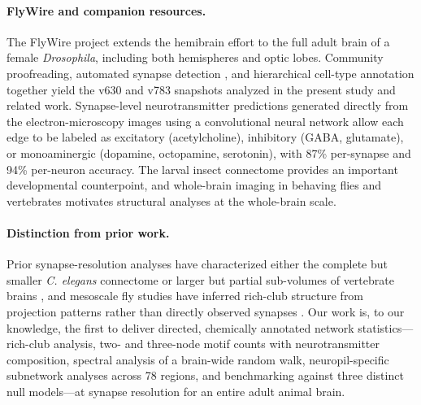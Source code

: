 \paragraph{FlyWire and companion resources.}
The FlyWire project \cite{dorkenwald2024flywire} extends the hemibrain effort to the full adult brain of a female \textit{Drosophila}, including both hemispheres and optic lobes. Community proofreading, automated synapse detection \cite{turner2021automated}, and hierarchical cell-type annotation \cite{schlegel2024whole} together yield the v630 and v783 snapshots analyzed in the present study and related work. Synapse-level neurotransmitter predictions generated directly from the electron-microscopy images using a convolutional neural network \cite{eckstein2024neurotransmitter} allow each edge to be labeled as excitatory (acetylcholine), inhibitory (GABA, glutamate), or monoaminergic (dopamine, octopamine, serotonin), with 87\% per-synapse and 94\% per-neuron accuracy. The larval insect connectome \cite{winding2023connectome} provides an important developmental counterpoint, and whole-brain imaging in behaving flies \cite{mann2021coupling} and vertebrates \cite{ahrens2013whole} motivates structural analyses at the whole-brain scale.

\paragraph{Distinction from prior work.}
Prior synapse-resolution analyses have characterized either the complete but smaller \textit{C. elegans} connectome \cite{varshney2011structural,cook2019whole} or larger but partial sub-volumes of vertebrate brains \cite{song2005highly,loomba2022connectomic,svara2022automated}, and mesoscale fly studies have inferred rich-club structure from projection patterns rather than directly observed synapses \cite{shih2015connectomics}. Our work is, to our knowledge, the first to deliver directed, chemically annotated network statistics---rich-club analysis, two- and three-node motif counts with neurotransmitter composition, spectral analysis of a brain-wide random walk, neuropil-specific subnetwork analyses across 78 regions, and benchmarking against three distinct null models---at synapse resolution for an entire adult animal brain.
